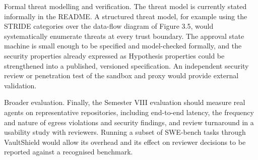 \documentclass[12pt,a4paper,oneside]{report}
\begin{document}
Formal threat modelling and verification. The threat model is currently stated informally in the README. A structured threat model, for example using the STRIDE categories over the data-flow diagram of Figure 3.5, would systematically enumerate threats at every trust boundary. The approval state machine is small enough to be specified and model-checked formally, and the security properties already expressed as Hypothesis properties could be strengthened into a published, versioned specification. An independent security review or penetration test of the sandbox and proxy would provide external validation.

Broader evaluation. Finally, the Semester VIII evaluation should measure real agents on representative repositories, including end-to-end latency, the frequency and nature of egress violations and security findings, and review turnaround in a usability study with reviewers. Running a subset of SWE-bench tasks \cite{ref2} through VaultShield would allow its overhead and its effect on reviewer decisions to be reported against a recognised benchmark.

\clearpage

\clearpage
\end{document}
